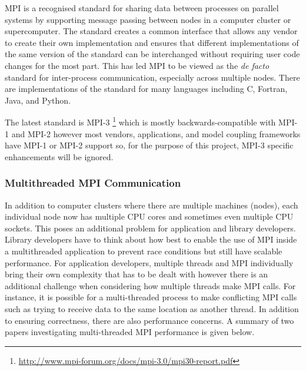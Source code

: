 
MPI is a recognised standard for sharing data between processes on parallel
systems by supporting message passing between nodes in a computer cluster or
supercomputer. The standard creates a common interface that allows any vendor to
create their own implementation and ensures that different implementations of
the same version of the standard can be interchanged without requiring user code
changes for the most part. This has led MPI to be viewed as the \textit{de
facto} standard for inter-process communication, especially across multiple
nodes. There are implementations of the standard for many languages including C,
Fortran, Java, and Python.

The latest standard is MPI-3
\footnote{\url{http://www.mpi-forum.org/docs/mpi-3.0/mpi30-report.pdf}} which is
mostly backwards-compatible with MPI-1 and MPI-2 however most vendors,
applications, and model coupling frameworks have MPI-1 or MPI-2 support so, for
the purpose of this project, MPI-3 specific enhancements will be ignored.

\subsubsection{Multithreaded MPI Communication}

In addition to computer clusters where there are multiple machines (nodes), each
individual node now has multiple CPU cores and sometimes even multiple CPU
sockets. This poses an additional problem for application and library
developers. Library developers have to think about how best to enable the use of
MPI inside a multithreaded application to prevent race conditions but still have
scalable performance. For application developers, multiple threads and MPI
individually bring their own complexity that has to be dealt with however there
is an additional challenge when considering how multiple threads make MPI calls.
For instance, it is possible for a multi-threaded process to make conflicting
MPI calls such as trying to receive data to the same location as another thread.
In addition to ensuring correctness, there are also performance concerns. A
summary of two papers investigating multi-threaded MPI performance is given
below.

